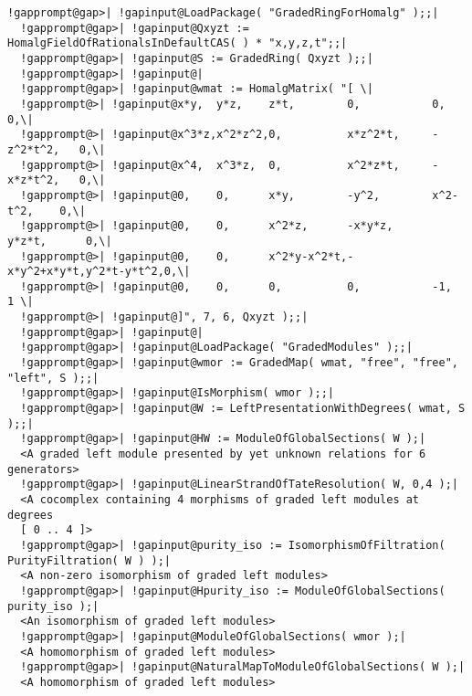 \documentclass[a4paper,11pt]{report}
\begin{document}
{{{\begin{Verbatim}[commandchars=!@|,fontsize=\small,frame=single,label=Example]
  !gapprompt@gap>| !gapinput@LoadPackage( "GradedRingForHomalg" );;|
  !gapprompt@gap>| !gapinput@Qxyzt := HomalgFieldOfRationalsInDefaultCAS( ) * "x,y,z,t";;|
  !gapprompt@gap>| !gapinput@S := GradedRing( Qxyzt );;|
  !gapprompt@gap>| !gapinput@|
  !gapprompt@gap>| !gapinput@wmat := HomalgMatrix( "[ \|
  !gapprompt@>| !gapinput@x*y,  y*z,    z*t,        0,           0,          0,\|
  !gapprompt@>| !gapinput@x^3*z,x^2*z^2,0,          x*z^2*t,     -z^2*t^2,   0,\|
  !gapprompt@>| !gapinput@x^4,  x^3*z,  0,          x^2*z*t,     -x*z*t^2,   0,\|
  !gapprompt@>| !gapinput@0,    0,      x*y,        -y^2,        x^2-t^2,    0,\|
  !gapprompt@>| !gapinput@0,    0,      x^2*z,      -x*y*z,      y*z*t,      0,\|
  !gapprompt@>| !gapinput@0,    0,      x^2*y-x^2*t,-x*y^2+x*y*t,y^2*t-y*t^2,0,\|
  !gapprompt@>| !gapinput@0,    0,      0,          0,           -1,         1 \|
  !gapprompt@>| !gapinput@]", 7, 6, Qxyzt );;|
  !gapprompt@gap>| !gapinput@|
  !gapprompt@gap>| !gapinput@LoadPackage( "GradedModules" );;|
  !gapprompt@gap>| !gapinput@wmor := GradedMap( wmat, "free", "free", "left", S );;|
  !gapprompt@gap>| !gapinput@IsMorphism( wmor );;|
  !gapprompt@gap>| !gapinput@W := LeftPresentationWithDegrees( wmat, S );;|
  !gapprompt@gap>| !gapinput@HW := ModuleOfGlobalSections( W );|
  <A graded left module presented by yet unknown relations for 6 generators>
  !gapprompt@gap>| !gapinput@LinearStrandOfTateResolution( W, 0,4 );|
  <A cocomplex containing 4 morphisms of graded left modules at degrees
  [ 0 .. 4 ]>
  !gapprompt@gap>| !gapinput@purity_iso := IsomorphismOfFiltration( PurityFiltration( W ) );|
  <A non-zero isomorphism of graded left modules>
  !gapprompt@gap>| !gapinput@Hpurity_iso := ModuleOfGlobalSections( purity_iso );|
  <An isomorphism of graded left modules>
  !gapprompt@gap>| !gapinput@ModuleOfGlobalSections( wmor );|
  <A homomorphism of graded left modules>
  !gapprompt@gap>| !gapinput@NaturalMapToModuleOfGlobalSections( W );|
  <A homomorphism of graded left modules>
\end{Verbatim}
 }

 
}}
\end{document}
